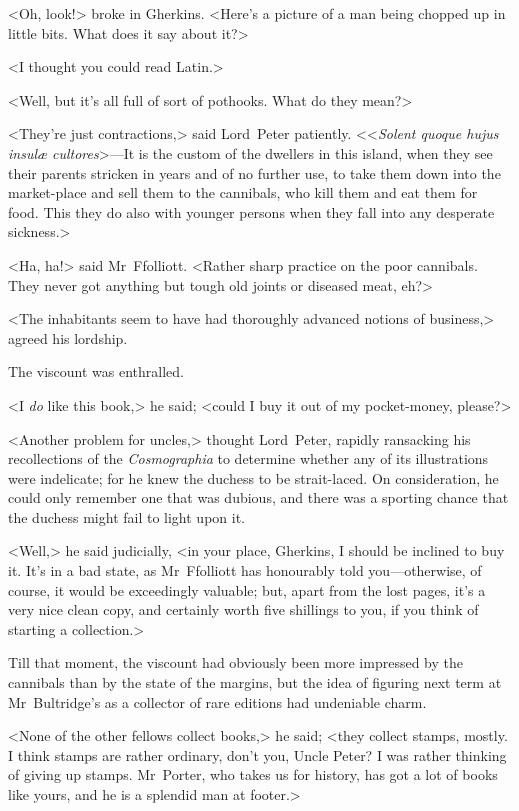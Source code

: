 <Oh, look!> broke in Gherkins. <Here's a picture of a man being chopped up in little bits. What does it say about it?>

<I thought you could read Latin.>

<Well, but it's all full of sort of pothooks. What do they mean?>

<They're just contractions,> said Lord~Peter patiently. <<\textit{Solent quoque hujus insulæ cultores}>—It is the custom of the dwellers in this island, when they see their parents stricken in years and of no further use, to take them down into the market-place and sell them to the cannibals, who kill them and eat them for food. This they do also with younger persons when they fall into any desperate sickness.>

<Ha, ha!> said Mr~Ffolliott. <Rather sharp practice on the poor cannibals. They never got anything but tough old joints or diseased meat, eh?>

<The inhabitants seem to have had thoroughly advanced notions of business,> agreed his lordship.

The viscount was enthralled.

<I \textit{do} like this book,> he said; <could I buy it out of my pocket-money, please?>

<Another problem for uncles,> thought Lord~Peter, rapidly ransacking his recollections of the \textit{Cosmographia} to determine whether any of its illustrations were indelicate; for he knew the duchess to be strait-laced. On consideration, he could only remember one that was dubious, and there was a sporting chance that the duchess might fail to light upon it.

<Well,> he said judicially, <in your place, Gherkins, I should be inclined to buy it. It's in a bad state, as Mr~Ffolliott has honourably told you—otherwise, of course, it would be exceedingly valuable; but, apart from the lost pages, it's a very nice clean copy, and certainly worth five shillings to you, if you think of starting a collection.>

Till that moment, the viscount had obviously been more impressed by the cannibals than by the state of the margins, but the idea of figuring next term at Mr~Bultridge's as a collector of rare editions had undeniable charm.

<None of the other fellows collect books,> he said; <they collect stamps, mostly. I think stamps are rather ordinary, don't you, Uncle Peter? I was rather thinking of giving up stamps. Mr~Porter, who takes us for history, has got a lot of books like yours, and he is a splendid man at footer.>

